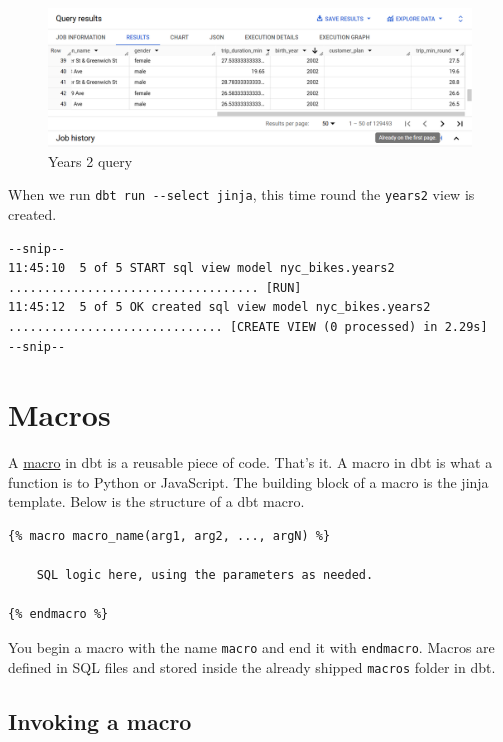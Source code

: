 \documentclass[
]{book}
\begin{document}
\begin{figure}
\centering
\includegraphics{./images/years2_query.png}
\caption{Years 2 query}
\end{figure}

When we run \texttt{dbt\ run\ -\/-select\ jinja}, this time round the \texttt{years2} view is created.

\begin{verbatim}
--snip--
11:45:10  5 of 5 START sql view model nyc_bikes.years2 ................................... [RUN]
11:45:12  5 of 5 OK created sql view model nyc_bikes.years2 .............................. [CREATE VIEW (0 processed) in 2.29s]
--snip--
\end{verbatim}

\hypertarget{macros}{%
\chapter{Macros}\label{macros}}

A \href{https://www.phdata.io/blog/what-are-dbt-macros/?utm_source=pocket_saves}{macro} in dbt is a reusable piece of code. That's it. A macro in dbt is what a function is to Python or JavaScript. The building block of a macro is the jinja template. Below is the structure of a dbt macro.

\begin{verbatim}
{% macro macro_name(arg1, arg2, ..., argN) %}

    SQL logic here, using the parameters as needed.

{% endmacro %}
\end{verbatim}

You begin a macro with the name \texttt{macro} and end it with \texttt{endmacro}. Macros are defined in SQL files and stored inside the already shipped \texttt{macros} folder in dbt.

\hypertarget{invoking-a-macro}{%
\section{Invoking a macro}\label{invoking-a-macro}}
\end{document}
